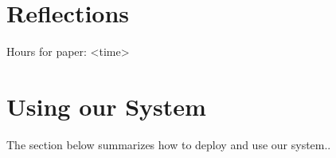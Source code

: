 \documentclass[sigplan, screen, 10pt]{acmart}
\begin{document}
\appendix

\section{Reflections}
\label{reflections}



Hours for paper: <time>

\section{Using our System}
\label{using-apx}

The section below summarizes how to deploy and use our system..
\end{document}
